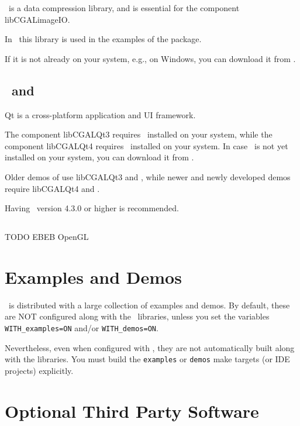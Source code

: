 \zlib\ is a data compression library, and is essential for the component libCGALimageIO.

In \cgal\ this library is used in the examples of the  package.

If it is not already on your system,
e.g., on Windows, you can download it from  \zlibpage.

\subsection{\ and \label{thirdparty:Qt3}\label{thirdparty:Qt4}\label{thirdparty:Qt}}

Qt is a cross-platform application and UI framework.

The component libCGALQt3 requires \ installed on your system, while
the component libCGALQt4 requires \ installed on your system. 
In case \qt\ is not yet installed on your system, you can download 
it from \qtpage. 

Older demos of \cgal use libCGALQt3 and , while newer and newly
developed demos require libCGALQt4 and . 

Having \ version 4.3.0 or higher is recommended.

\subsection{\opengl \label{thirdparty:OpenGL}}

TODO EBEB OpenGL

\section{\cgal Examples and Demos}

\cgal\ is distributed with a large collection of examples and demos. By default, these are NOT configured along with
the \cgal\ libraries, unless you set the variables {\tt WITH\_examples=ON} and/or {\tt WITH\_demos=ON}.

Nevertheless, even when configured with \cgal, they are not automatically built along with the libraries.
You must build the \texttt{examples} or \texttt{demos} make targets (or IDE projects) explicitly.

\section{Optional Third Party Software\label{sec:optional3rdpartysoftware}}

